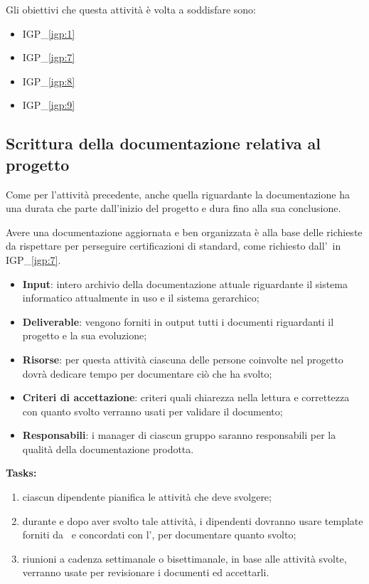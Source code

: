 		Gli obiettivi che questa attività è volta a soddisfare sono:
		\begin{itemize}[noitemsep]
			\renewcommand\labelitemi{--}
			\item {\color{pantone}IGP\_\ref{igp:1}}
			\item {\color{pantone}IGP\_\ref{igp:7}}
			\item {\color{pantone}IGP\_\ref{igp:8}}
			\item {\color{pantone}IGP\_\ref{igp:9}}
		\end{itemize}

	\subsection{Scrittura della documentazione relativa al progetto}
	
		Come per l'attività precedente, anche quella riguardante la documentazione ha una durata che parte dall'inizio del progetto e dura fino alla sua conclusione.
		
		Avere una documentazione aggiornata e ben organizzata è alla base delle richieste da rispettare per perseguire certificazioni di standard, come richiesto dall'\istituto~in {\color{pantone}IGP\_\ref{igp:7}}.
		
		\begin{itemize}[noitemsep]
			\renewcommand\labelitemi{--}
			\item \textbf{Input}: intero archivio della documentazione attuale riguardante il sistema informatico attualmente in uso e il sistema gerarchico;
			\item \textbf{Deliverable}: vengono forniti in output tutti i documenti riguardanti il progetto e la sua evoluzione;
			\item \textbf{Risorse}: per questa attività ciascuna delle persone coinvolte nel progetto dovrà dedicare tempo per documentare ciò che ha svolto;
			\item \textbf{Criteri di accettazione}: criteri quali chiarezza nella lettura e correttezza con quanto svolto verranno usati per validare il documento;
			\item \textbf{Responsabili}: i manager di ciascun gruppo saranno responsabili per la qualità della documentazione prodotta.
		\end{itemize}
		
		\textbf{Tasks:}
		\begin{enumerate}[noitemsep]
			\item ciascun dipendente pianifica le attività che deve svolgere;
			\item durante e dopo aver svolto tale attività, i dipendenti dovranno usare template forniti da \azienda~e concordati con l'\istituto, per documentare quanto svolto;
			\item riunioni a cadenza settimanale o bisettimanale, in base alle attività svolte, verranno usate per revisionare i documenti ed accettarli.
		\end{enumerate}
	
